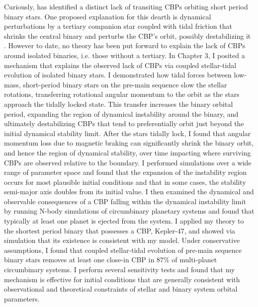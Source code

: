 Curiously, \kepler has identified a distinct lack of transiting CBPs orbiting short period binary stars. One proposed explanation for this dearth is dynamical perturbations by a tertiary companion star coupled with tidal friction that shrinks the central binary and perturbs the CBP's orbit, possibly destabilizing it \citep{Munoz2015,Martin2015b,Hamers2016}.  However to date, no theory has been put forward to explain the lack of CBPs around isolated binaries, i.e. those without a tertiary. In Chapter 3, I posited a mechanism that explains the observed lack of CBPs via coupled stellar-tidal evolution of isolated binary stars. I demonstrated how tidal forces between low-mass, short-period binary stars on the pre-main sequence slow the stellar rotations, transferring rotational angular momentum to the orbit as the stars approach the tidally locked state.  This transfer increases the binary orbital period, expanding the region of dynamical instability around the binary, and ultimately destabilizing CBPs that tend to preferentially orbit just beyond the initial dynamical stability limit.  After the stars tidally lock, I found that angular momentum loss due to magnetic braking can significantly shrink the binary orbit, and hence the region of dynamical stability, over time impacting where surviving CBPs are observed relative to the boundary.  I performed simulations over a wide range of parameter space and found that the expansion of the instability region occurs for most plausible initial conditions and that in some cases, the stability semi-major axis doubles from its initial value.  I then examined the dynamical and observable consequences of a CBP falling within the dynamical instability limit by running N-body simulations of circumbinary planetary systems and found that typically at least one planet is ejected from the system.  I applied my theory to the shortest period \kepler binary that possesses a CBP, Kepler-47, and showed via simulation that its existence is consistent with my model.  Under conservative assumptions, I found that coupled stellar-tidal evolution of pre-main sequence binary stars removes at least one close-in CBP in $87\%$ of multi-planet circumbinary systems. I perform several sensitivity tests and found that my mechanism is effective for initial conditions that are generally consistent with observational and theoretical constraints of stellar and binary system orbital parameters. 

